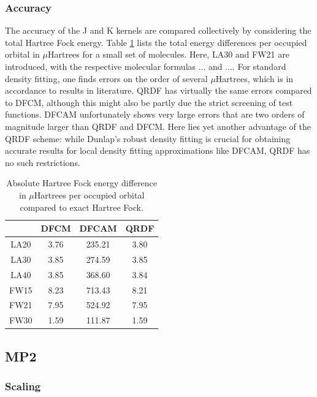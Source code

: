 \subsubsection{Accuracy}

The accuracy of the J and K kernels are compared collectively by considering the total Hartree Fock energy. Table \ref{tab:GS_HFACCURACY} lists the total energy differences per occupied orbital in $\mu$Hartrees for a small set of molecules. Here, LA30 and FW21 are introduced, with the respective molecular formulas ... and .... For standard density fitting, one finds errors on the order of several $\mu$Hartrees, which is in accordance to results in literature. QRDF has virtually the same errors compared to DFCM, although this might also be partly due the strict screening of test functions. DFCAM unfortunately shows very large errors that are two orders of magnitude larger than QRDF and DFCM. Here lies yet another advantage of the QRDF scheme: while Dunlap's robust density fitting is crucial for obtaining accurate results for local density fitting approximations like DFCAM, QRDF has no such restrictions. 

\begin{table}
\begin{tabular}{cccc}
 \hline
 & DFCM & DFCAM & QRDF \\ \hline 
LA20 & 3.76 & 235.21 & 3.80 \\ 
LA30  & 3.85 & 274.59 & 3.85 \\ 
LA40 & 3.85 & 368.60 & 3.84 \\ 
FW15 & 8.23 & 713.43 & 8.21 \\ 
FW21 & 7.95 & 524.92 & 7.95 \\ 
FW30 & 1.59 & 111.87 & 1.59 \\ 
\hline 
\end{tabular}
\label{tab:GS_HFACCURACY}
\caption{Absolute Hartree Fock energy difference in $\mu$Hartrees per occupied orbital compared to exact Hartree Fock.}
\end{table}

\subsection{MP2}

\subsubsection{Scaling}

